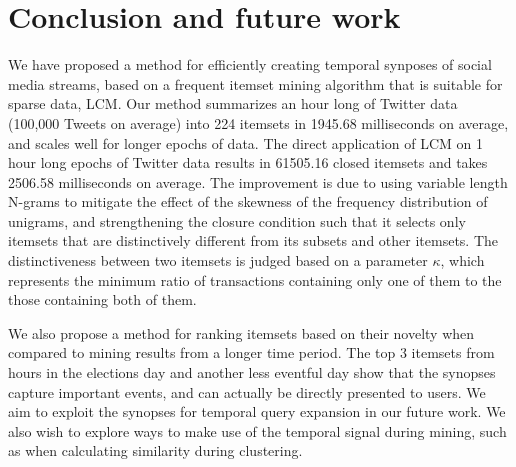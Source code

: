 \documentclass{sig-alternate}
\begin{document}
 
  


\section{Conclusion and future work}
\label{sec:concfut}
We have proposed a method for efficiently creating temporal synposes of social media streams, based on a frequent itemset mining algorithm that is suitable for sparse data, LCM. Our method summarizes an hour long of Twitter data (100,000 Tweets on average) into 224 itemsets in 1945.68 milliseconds on average, and scales well for longer epochs of data. The direct application of LCM on 1 hour long epochs of Twitter data results in 61505.16 closed itemsets and takes 2506.58 milliseconds on average. The improvement is due to using variable length N-grams to mitigate the effect of the skewness of the frequency distribution of unigrams, and strengthening  the closure condition such that it selects only itemsets that are distinctively different from its subsets and other itemsets. The distinctiveness between two itemsets is  judged based on a parameter $\kappa$, which represents the minimum ratio of transactions containing only one of them to the those containing both of them.

We also propose a method for ranking itemsets based on their novelty when compared to mining results from a longer time period. The top 3 itemsets from hours in the elections day and another less eventful day show that the synopses capture important events, and can actually be directly presented to users. We aim to exploit the synopses for temporal query expansion in our future work. We also wish to explore ways to make use of the temporal signal during mining, such as when calculating similarity during clustering.
\end{document}

